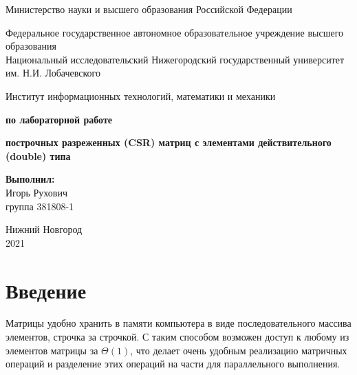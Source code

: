 \documentclass{report}
\begin{document}
\begin{titlepage}

\begin{center}
Министерство науки и высшего образования Российской Федерации
\end{center}

\begin{center}
Федеральное государственное автономное образовательное учреждение высшего образования \\
Национальный исследовательский Нижегородский государственный университет им. Н.И. Лобачевского
\end{center}

\begin{center}
Институт информационных технологий, математики и механики
\end{center}

\vspace{4em}

\begin{center}
\textbf{ по лабораторной работе} \\
\end{center}
\begin{center}
\textbf{ построчных разреженных (CSR) матриц с элементами действительного (double) типа} \\
\end{center}

\vspace{4em}

\newbox{\lbox}
\newlength{\maxl}
\setlength{\maxl}{\wd\lbox}
\hfill\parbox{7cm}{
\hspace*{5cm}\hspace*{-5cm}\textbf{Выполнил:} \\ Игорь Рухович \\ группа 381808-1
}

\vspace{\fill}

\begin{center} Нижний Новгород \\ 2021 \end{center}

\end{titlepage}

\setcounter{page}{2}

\tableofcontents

\newpage
\section*{Введение}
Матрицы удобно хранить в памяти компьютера в виде последовательного массива элементов, строчка за строчкой. С таким способом возможен доступ к любому из элементов матрицы за $\Theta(1)$, что делает очень удобным реализацию матричных операций и разделение этих операций на части для параллельного выполнения.
\end{document}
